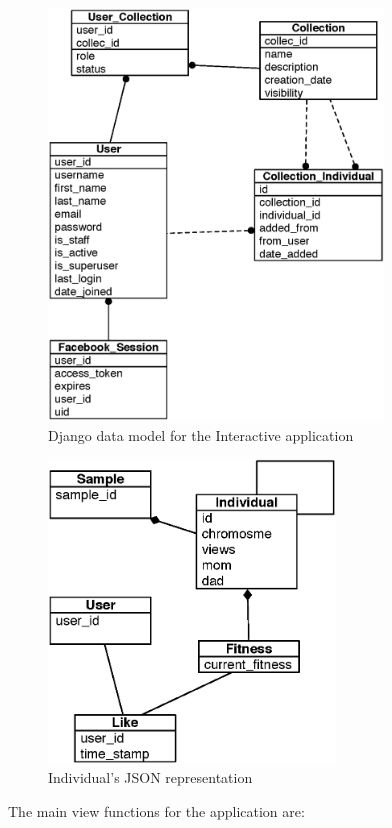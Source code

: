 \documentclass{sig-alternate}
\begin{document}
\begin{figure}[!t]
    \centering
        \includegraphics[width=3.5in]{datamodel.eps}
    \caption{Django data model for the Interactive application}
    \label{datamodel}
\end{figure}

\begin{figure}[!t]
    \centering
        \includegraphics[width=3in]{redisModel.eps}
    \caption{Individual's JSON representation}
    \label{redisModel}
\end{figure}

The main view functions for the application are:
\end{document}
